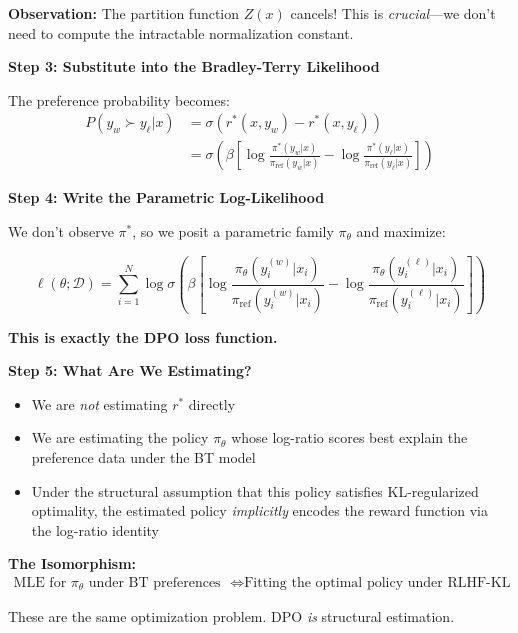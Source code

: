 \documentclass[11pt]{article}
\newcommand{\1}{\mathbf{1}}
\theoremstyle{plain}
\theoremstyle{definition}
\theoremstyle{remark}
\begin{document}
\textbf{Observation:} The partition function $Z(x)$ cancels! This is \emph{crucial}—we don't need to compute the intractable normalization constant.

\noindent \textbf{Step 3: Substitute into the Bradley-Terry Likelihood}

The preference probability becomes:
\begin{align*}
P(y_w \succ y_\ell | x) &= \sigma(r^*(x,y_w) - r^*(x,y_\ell)) \\
&= \sigma\left(\beta \left[\log \frac{\pi^*(y_w|x)}{\pi_{\text{ref}}(y_w|x)} - \log \frac{\pi^*(y_\ell|x)}{\pi_{\text{ref}}(y_\ell|x)}\right]\right)
\end{align*}

\noindent \textbf{Step 4: Write the Parametric Log-Likelihood}

We don't observe $\pi^*$, so we posit a parametric family $\pi_\theta$ and maximize:

$$
\boxed{
\ell(\theta; \mathcal{D}) = \sum_{i=1}^N \log \sigma\left(\beta \left[\log \frac{\pi_\theta(y_i^{(w)}|x_i)}{\pi_{\text{ref}}(y_i^{(w)}|x_i)} - \log \frac{\pi_\theta(y_i^{(\ell)}|x_i)}{\pi_{\text{ref}}(y_i^{(\ell)}|x_i)}\right]\right)
}
$$

\textbf{This is exactly the DPO loss function.}

\noindent \textbf{Step 5: What Are We Estimating?}

\begin{itemize}
\item We are \emph{not} estimating $r^*$ directly
\item We are estimating the policy $\pi_\theta$ whose log-ratio scores best explain the preference data under the BT model
\item Under the structural assumption that this policy satisfies KL-regularized optimality, the estimated policy \emph{implicitly} encodes the reward function via the log-ratio identity
\end{itemize}

\begin{keypoint}
\textbf{The Isomorphism:} 
\begin{align*}
\text{MLE for } \pi_\theta \text{ under BT preferences} &\Leftrightarrow \text{Fitting the optimal policy under RLHF-KL}
\end{align*}

These are the same optimization problem. DPO \emph{is} structural estimation.
\end{keypoint}
\end{document}
